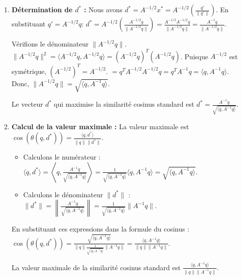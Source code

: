 \documentclass[11pt,a4paper]{report}
\begin{document}
\begin{enumerate}
  Le problème d'optimisation devient : maximiser
  \(\frac{\langle q', x \rangle}{\|q\| \|A^{-1/2} x\|}\) sous la
  contrainte \(\|x\|=1\). Par l'inégalité de Cauchy-Schwarz pour le
  produit scalaire standard :
  \(\langle q', x \rangle \le \|q'\| \|x\|\). Puisque \(\|x\|=1\), nous
  avons \(\langle q', x \rangle \le \|q'\|\). L'égalité est atteinte
  lorsque \(x\) est colinéaire à \(q'\), c'est-à-dire \(x = \alpha q'\)
  pour un scalaire \(\alpha\). Avec la contrainte \(\|x\|=1\), nous
  avons \(\|\alpha q'\|=1 \implies |\alpha| \|q'\|=1\). Pour maximiser
  \(\langle q', x \rangle\), nous choisissons
  \(\alpha = \frac{1}{\|q'\|}\) (pour que \(\langle q', x \rangle\) soit
  positif). Donc, \(x^* = \frac{q'}{\|q'\|}\).
\item
  \textbf{Détermination de \(d^*\) :} Nous avons
  \(d^* = A^{-1/2} x^* = A^{-1/2} \left( \frac{q'}{\|q'\|} \right)\). En
  substituant \(q' = A^{-1/2} q\):
  \(d^* = A^{-1/2} \left( \frac{A^{-1/2} q}{\|A^{-1/2} q\|} \right) = \frac{A^{-1/2} A^{-1/2} q}{\|A^{-1/2} q\|} = \frac{A^{-1} q}{\|A^{-1/2} q\|}\).

  Vérifions le dénominateur \(\|A^{-1/2} q\|\).
  \(\|A^{-1/2} q\|^2 = \langle A^{-1/2} q, A^{-1/2} q \rangle = (A^{-1/2} q)^T (A^{-1/2} q)\).
  Puisque \(A^{-1/2}\) est symétrique, \((A^{-1/2})^T = A^{-1/2}\).
  \(= q^T A^{-1/2} A^{-1/2} q = q^T A^{-1} q = \langle q, A^{-1} q \rangle\).
  Donc, \(\|A^{-1/2} q\| = \sqrt{\langle q, A^{-1} q \rangle}\).

  Le vecteur \(d^*\) qui maximise la similarité cosinus standard est
  \(d^* = \frac{A^{-1} q}{\sqrt{\langle q, A^{-1} q \rangle}}\).
\item
  \textbf{Calcul de la valeur maximale :} La valeur maximale est
  \(\cos(\theta(q,d^*)) = \frac{\langle q, d^* \rangle}{\|q\| \|d^*\|}\).

  \begin{itemize}

  \item
    Calculons le numérateur :
    \(\langle q, d^* \rangle = \left\langle q, \frac{A^{-1} q}{\sqrt{\langle q, A^{-1} q \rangle}} \right\rangle = \frac{1}{\sqrt{\langle q, A^{-1} q \rangle}} \langle q, A^{-1} q \rangle = \sqrt{\langle q, A^{-1} q \rangle}\).
  \item
    Calculons le dénominateur \(\|d^*\|\) :
    \(\|d^*\| = \left\| \frac{A^{-1} q}{\sqrt{\langle q, A^{-1} q \rangle}} \right\| = \frac{1}{\sqrt{\langle q, A^{-1} q \rangle}} \|A^{-1} q\|\).
  \end{itemize}

  En substituant ces expressions dans la formule du cosinus :
  \(\cos(\theta(q,d^*)) = \frac{\sqrt{\langle q, A^{-1} q \rangle}}{\|q\| \frac{1}{\sqrt{\langle q, A^{-1} q \rangle}} \|A^{-1} q\|} = \frac{\langle q, A^{-1} q \rangle}{\|q\| \|A^{-1} q\|}\).

  La valeur maximale de la similarité cosinus standard est
  \(\frac{\langle q, A^{-1} q \rangle}{\|q\| \|A^{-1} q\|}\).
\end{enumerate}
\end{document}
